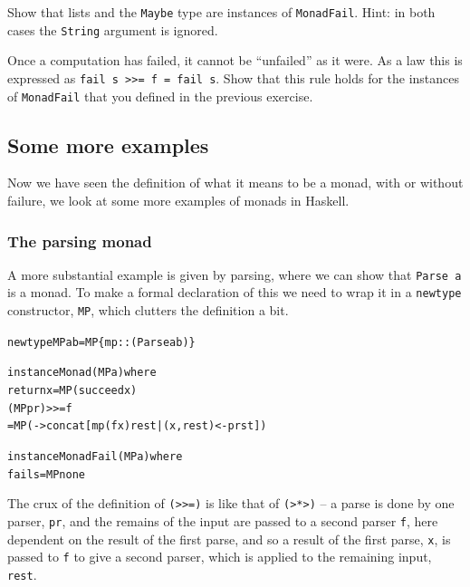 \begin{exercises}
 

\item
Show that lists and the \texttt{Maybe} type are instances of \texttt{MonadFail}. Hint: in both cases the \texttt{String} argument is ignored.

\item
Once a computation has failed, it cannot be ``unfailed'' as it were. As a law this is expressed as \texttt{fail s >>= f  =  fail s}. Show that this rule holds for the instances of \texttt{MonadFail} that you defined in the previous exercise.


\end{exercises}

\subsection*{Some more examples}

Now we have seen the definition of what it means to be a monad, with or without failure, we look at some more examples of monads in Haskell.



\subsubsection*{The parsing monad}


A more substantial example is given by parsing, where we can show that
\texttt{Parse a} is a monad. To make a formal declaration of this we
need to wrap it in a \texttt{newtype} constructor, \texttt{MP},
which clutters the definition a bit.
\begin{alltt}
newtype MP a b = MP \{ mp :: (Parse a b) \}

instance Monad (MP a) where
  return x = MP (succeed x)
  (MP pr) >>= f 
    = MP ( -> concat [ mp (f x) rest | (x,rest) <- pr st ])

instance MonadFail (MP a) where
  fail s   = MP none
\end{alltt}
The crux of the definition of \texttt{(>>=)} is like that of
\texttt{(>*>)} -- a parse is done by one parser, \texttt{pr}, and the remains of the
input are passed to a second parser \texttt{f}, here dependent on the result of the
first parse, and so a result of the first parse, \texttt{x}, is passed
to \texttt{f} to give a second parser, which is applied to the remaining
input, \texttt{rest}.

